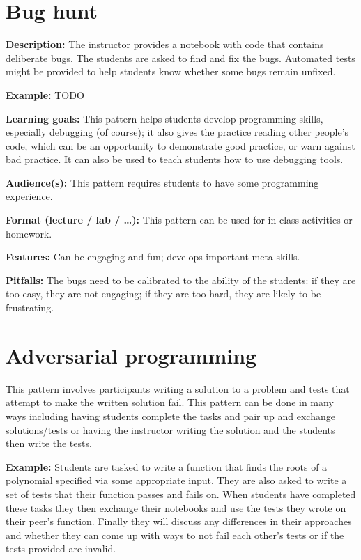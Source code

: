 \documentclass[]{book}
\begin{document}
\section{Bug hunt}\label{bug-hunt}

\textbf{Description:} The instructor provides a notebook with code that
contains deliberate bugs. The students are asked to find and fix the
bugs. Automated tests might be provided to help students know whether
some bugs remain unfixed.

\textbf{Example:} TODO

\textbf{Learning goals:} This pattern helps students develop programming
skills, especially debugging (of course); it also gives the practice
reading other people's code, which can be an opportunity to demonstrate
good practice, or warn against bad practice. It can also be used to
teach students how to use debugging tools.

\textbf{Audience(s):} This pattern requires students to have some
programming experience.

\textbf{Format (lecture / lab / \ldots{}):} This pattern can be used for
in-class activities or homework.

\textbf{Features:} Can be engaging and fun; develops important
meta-skills.

\textbf{Pitfalls:} The bugs need to be calibrated to the ability of the
students: if they are too easy, they are not engaging; if they are too
hard, they are likely to be frustrating.

\section{Adversarial programming}\label{adversarial-programming}

This pattern involves participants writing a solution to a problem and
tests that attempt to make the written solution fail. This pattern can
be done in many ways including having students complete the tasks and
pair up and exchange solutions/tests or having the instructor writing
the solution and the students then write the tests.

\textbf{Example:} Students are tasked to write a function that finds the
roots of a polynomial specified via some appropriate input. They are
also asked to write a set of tests that their function passes and fails
on. When students have completed these tasks they then exchange their
notebooks and use the tests they wrote on their peer's function. Finally
they will discuss any differences in their approaches and whether they
can come up with ways to not fail each other's tests or if the tests
provided are invalid.
\end{document}
